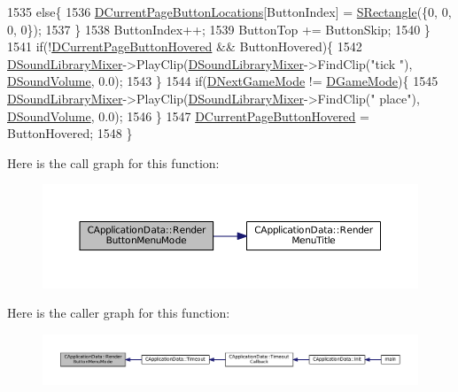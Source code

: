 \begin{DoxyCode}
1535         \textcolor{keywordflow}{else}\{
1536             \hyperlink{classCApplicationData_a3615df8e23cea3ce17f11cf61340a7b4}{DCurrentPageButtonLocations}[ButtonIndex] = 
      \hyperlink{structSRectangle}{SRectangle}(\{0, 0, 0, 0\});
1537         \}
1538         ButtonIndex++;
1539         ButtonTop += ButtonSkip;
1540     \}
1541     \textcolor{keywordflow}{if}(!\hyperlink{classCApplicationData_a96b3a9b5c9965540007dff3fa85587fa}{DCurrentPageButtonHovered} && ButtonHovered)\{
1542         \hyperlink{classCApplicationData_aa1e6876121bb4fb229ec6b930a8a6766}{DSoundLibraryMixer}->PlayClip(\hyperlink{classCApplicationData_aa1e6876121bb4fb229ec6b930a8a6766}{DSoundLibraryMixer}->FindClip(\textcolor{stringliteral}{"tick
      "}), \hyperlink{classCApplicationData_aa6e540f860dcb1929ef36ddce3be3691}{DSoundVolume}, 0.0);
1543     \}
1544     \textcolor{keywordflow}{if}(\hyperlink{classCApplicationData_a3b67edeacd70201dcf96fa9fa8aa2107}{DNextGameMode} != \hyperlink{classCApplicationData_a2f906f2b4208ecb2a057e6b62e549685}{DGameMode})\{
1545         \hyperlink{classCApplicationData_aa1e6876121bb4fb229ec6b930a8a6766}{DSoundLibraryMixer}->PlayClip(\hyperlink{classCApplicationData_aa1e6876121bb4fb229ec6b930a8a6766}{DSoundLibraryMixer}->FindClip(\textcolor{stringliteral}{"
      place"}), \hyperlink{classCApplicationData_aa6e540f860dcb1929ef36ddce3be3691}{DSoundVolume}, 0.0);
1546     \}
1547     \hyperlink{classCApplicationData_a96b3a9b5c9965540007dff3fa85587fa}{DCurrentPageButtonHovered} = ButtonHovered;
1548 \}
\end{DoxyCode}
Here is the call graph for this function\+:\nopagebreak
\begin{figure}[H]
\begin{center}
\leavevmode
\includegraphics[width=350pt]{classCApplicationData_a4766e5533d32e4194816f5a4ea838bd3_cgraph}
\end{center}
\end{figure}
Here is the caller graph for this function\+:\nopagebreak
\begin{figure}[H]
\begin{center}
\leavevmode
\includegraphics[width=350pt]{classCApplicationData_a4766e5533d32e4194816f5a4ea838bd3_icgraph}
\end{center}
\end{figure}
\hypertarget{classCApplicationData_a7da1dd0b9a8d7c68d8df5f60b4e94189}{}\label{classCApplicationData_a7da1dd0b9a8d7c68d8df5f60b4e94189} 
